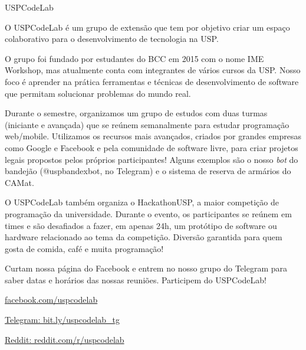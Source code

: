 \begin{subsecao}{USPCodeLab}


O USPCodeLab é um grupo de extensão que tem por objetivo criar um espaço
colaborativo para o desenvolvimento de tecnologia na USP.

O grupo foi fundado por estudantes do BCC em 2015 com o nome IME Workshop, mas
atualmente conta com integrantes de vários cursos da USP. Nosso foco é aprender
na prática ferramentas e técnicas de desenvolvimento de software que permitam
solucionar problemas do mundo real.

Durante o semestre, organizamos um grupo de estudos com duas turmas (iniciante
e avançada) que se reúnem semanalmente para estudar programação web/mobile.
Utilizamos os recursos mais avançados, criados por grandes empresas como Google
e Facebook e pela comunidade de software livre, para criar projetos legais
propostos pelos próprios participantes! Alguns exemplos são o nosso \textit{bot}
do bandejão (@uspbandexbot, no Telegram) e o sistema de reserva de armários do
CAMat.

O USPCodeLab também organiza o HackathonUSP, a maior competição de programação
da universidade. Durante o evento, os participantes se reúnem em times e são
desafiados a fazer, em apenas 24h, um protótipo de software ou hardware
relacionado ao tema da competição. Diversão garantida para quem gosta de comida,
café e muita programação!

Curtam nossa página do Facebook e entrem no nosso grupo do Telegram para saber
datas e horários das nossas reuniões. Participem do USPCodeLab!

\begin{center}
  \Large
  \url{facebook.com/uspcodelab}

  \url{Telegram: bit.ly/uspcodelab_tg}

  \url{Reddit: reddit.com/r/uspcodelab}
\end{center}

\end{subsecao}
